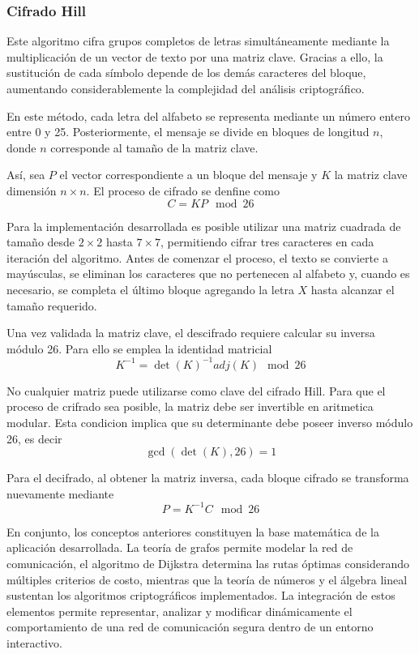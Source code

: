 \documentclass[conference]{IEEEtran}
\begin{document}
\subsubsection{Cifrado Hill}
Este algoritmo cifra grupos completos de letras simultáneamente mediante la multiplicación de un vector de texto por una matriz clave. Gracias a ello, la sustitución de cada símbolo depende de los demás caracteres del bloque, aumentando considerablemente la complejidad del análisis criptográfico.

En este método, cada letra del alfabeto se representa mediante un número entero entre 0 y 25. Posteriormente, el mensaje se divide en bloques de longitud $n$, donde $n$ corresponde al tamaño de la matriz clave.

Así, sea $P$ el vector correspondiente a un bloque del mensaje y $K$ la matriz clave dimensión $n \times n$. El proceso de cifrado se denfine como 
\[
C=KP \mod 26
\]

Para la implementación desarrollada es posible utilizar una matriz cuadrada de tamaño desde $2 \times 2$ hasta $7 \times 7$, permitiendo cifrar tres caracteres en cada iteración del algoritmo. Antes de comenzar el proceso, el texto se convierte a mayúsculas, se eliminan los caracteres que no pertenecen al alfabeto y, cuando es necesario, se completa el último bloque agregando la letra $X$ hasta alcanzar el tamaño requerido.

Una vez validada la matriz clave, el descifrado requiere calcular su inversa módulo 26. Para ello se emplea la identidad matricial
\[
K^{-1}=\det (K)^{-1}adj(K) \mod 26
\]

No cualquier matriz puede utilizarse como clave del cifrado Hill. Para que el proceso de crifrado sea posible, la matriz debe ser invertible en aritmetica modular\cite{Invertible hill gcd}. Esta condicion implica que su determinante debe poseer inverso módulo 26, es decir
\[
\gcd(\det(K), 26) = 1
\]

Para el decifrado, al obtener la matriz inversa, cada bloque cifrado se transforma nuevamente mediante
\[
P=K^{-1}C \mod 26
\]


En conjunto, los conceptos anteriores constituyen la base matemática de la aplicación desarrollada. La teoría de grafos permite modelar la red de comunicación, el algoritmo de Dijkstra determina las rutas óptimas considerando múltiples criterios de costo, mientras que la teoría de números y el álgebra lineal sustentan los algoritmos criptográficos implementados. La integración de estos elementos permite representar, analizar y modificar dinámicamente el comportamiento de una red de comunicación segura dentro de un entorno interactivo.
\end{document}
